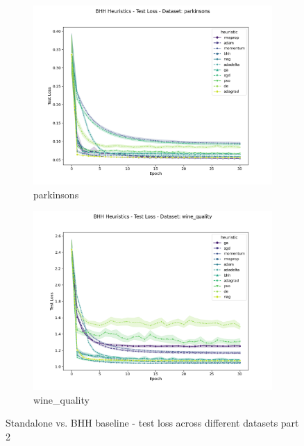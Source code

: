 \begin{figure}[htbp]
	\begin{subfigure}{0.48\textwidth}
    	\centering
        \includegraphics[width=\textwidth]{analysis/standalone/figures/test/loss/parkinsons.png}
        \caption{parkinsons}
        \label{fig:results:standalone:figures:test:loss:parkinsons}
	\end{subfigure}
    \begin{subfigure}{0.48\textwidth}
    	\centering
        \includegraphics[width=\textwidth]{analysis/standalone/figures/test/loss/wine_quality.png}
        \caption{wine\_quality}
        \label{fig:results:standalone:figures:test:loss:wine_quality}
	\end{subfigure}
	\caption{Standalone vs. \Acs{BHH} baseline - test loss across different datasets part 2}
	\label{fig:results:standalone:figures:test:loss:various2}
\end{figure}


